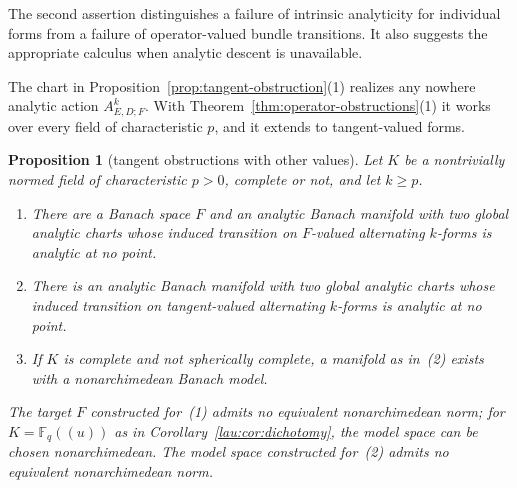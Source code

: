 \documentclass[11pt]{amsart}
\newtheorem{proposition}[theorem]{Proposition}
\theoremstyle{definition}
\theoremstyle{remark}
\numberwithin{equation}{section}
\newcommand{\F}{\mathbb F}
\begin{document}
The second assertion distinguishes a failure of intrinsic analyticity for individual forms from a failure of operator-valued bundle transitions. It also suggests the appropriate calculus when analytic descent is unavailable.

The chart in Proposition~\ref{prop:tangent-obstruction}(1) realizes any nowhere analytic action $A^k_{E,D;F}$. With Theorem~\ref{thm:operator-obstructions}(1) it works over every field of characteristic $p$, and it extends to tangent-valued forms.

\begin{proposition}[tangent obstructions with other values]\label{prop:tangent-values}
Let $K$ be a nontrivially normed field of characteristic $p>0$, complete or not, and let $k\ge p$.
\begin{enumerate}
\item There are a Banach space $F$ and an analytic Banach manifold with two global analytic charts whose induced transition on $F$\nobreakdash-valued alternating $k$\nobreakdash-forms is analytic at no point.
\item There is an analytic Banach manifold with two global analytic charts whose induced transition on tangent-valued alternating $k$\nobreakdash-forms is analytic at no point.
\item If $K$ is complete and not spherically complete, a manifold as in~(2) exists with a nonarchimedean Banach model.
\end{enumerate}
The target $F$ constructed for~(1) admits no equivalent nonarchimedean norm; for $K=\F_q((u))$ as in Corollary~\ref{lau:cor:dichotomy}, the model space can be chosen nonarchimedean. The model space constructed for~(2) admits no equivalent nonarchimedean norm.
\end{proposition}
\end{document}
